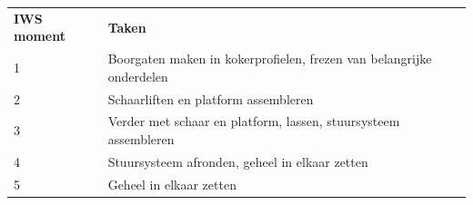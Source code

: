 \begin{table}[H]
\begin{tabularx}{\textwidth}{ll}
\textbf{IWS moment} & \textbf{Taken}                                                       \\
1                   & Boorgaten maken in kokerprofielen, \newline frezen van belangrijke onderdelen \\
2                   & Schaarliften en platform assembleren                                 \\
3                   & Verder met schaar en platform, lassen, stuursysteem assembleren      \\
4                   & Stuursysteem afronden, geheel in elkaar zetten                       \\
5                   & Geheel in elkaar zetten 
\end{tabularx}
\end{table}
